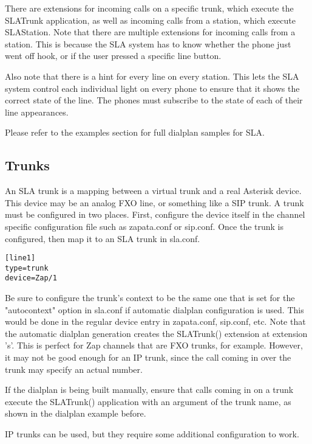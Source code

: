 There are extensions for incoming calls on a specific trunk, which execute the SLATrunk
application, as well as incoming calls from a station, which execute SLAStation.
Note that there are multiple extensions for incoming calls from a station.  This is
because the SLA system has to know whether the phone just went off hook, or if the
user pressed a specific line button.

Also note that there is a hint for every line on every station.  This lets the SLA
system control each individual light on every phone to ensure that it shows the
correct state of the line.  The phones must subscribe to the state of each of their
line appearances.

Please refer to the examples section for full dialplan samples for SLA.

\subsection{Trunks}
\label{trunks}

An SLA trunk is a mapping between a virtual trunk and a real Asterisk device.
This device may be an analog FXO line, or something like a SIP trunk.  A trunk
must be configured in two places.  First, configure the device itself in the
channel specific configuration file such as zapata.conf or sip.conf.  Once the
trunk is configured, then map it to an SLA trunk in sla.conf.
\begin{astlisting}
\begin{verbatim}
[line1]
type=trunk
device=Zap/1
\end{verbatim}
\end{astlisting}

Be sure to configure the trunk's context to be the same one that is set for the
"autocontext" option in sla.conf if automatic dialplan configuration is used.
This would be done in the regular device entry in zapata.conf, sip.conf, etc.
Note that the automatic dialplan generation creates the SLATrunk() extension
at extension 's'.  This is perfect for Zap channels that are FXO trunks, for
example.  However, it may not be good enough for an IP trunk, since the call
coming in over the trunk may specify an actual number.

If the dialplan is being built manually, ensure that calls coming in on a trunk
execute the SLATrunk() application with an argument of the trunk name, as shown
in the dialplan example before.

IP trunks can be used, but they require some additional configuration to work.

